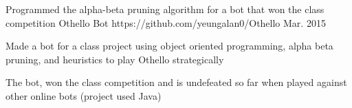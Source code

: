 \begin{cventries}






\vspace{-.25em}
\cventry
{Programmed the alpha-beta pruning algorithm for a bot that won the class competition} %
{Othello Bot} %
{https://github.com/yeungalan0/Othello} %
{Mar. 2015} %
{ %
\begin{cvitems}
\item {Made a bot for a class project using object oriented programming, alpha beta pruning, and heuristics to play Othello strategically}
\item {The bot, won the class competition and is undefeated so far when played against other online bots (project used Java)}
\end{cvitems}
}


\end{cventries}
